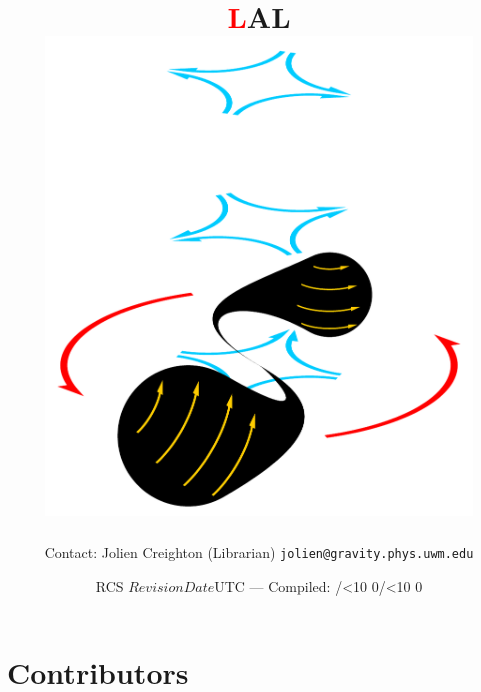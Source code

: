 \documentclass[oneside]{book}
\def\rcs#1{\def\next##1#1{\mbox{##1}}\next}
\begin{document}
\frontmatter


\title{
\sffamily\bfseries\Huge
\textcolor{red}{\lsdfont L}AL
\hspace{-2em}
\\[\bigskipamount]
\includegraphics[height=5in]{merger}
}
\author{Contact: Jolien Creighton (Librarian) \texttt{jolien@gravity.phys.uwm.edu}}
\date{RCS \rcs$Revision$\rcs$Date$UTC --- Compiled:
\number\year/\ifnum\month<10 0\fi\number\month/\ifnum\day<10 0\fi\number\day}

\maketitle

\section*{Contributors}
\begin{verse}
%
\end{verse}
\end{document}
